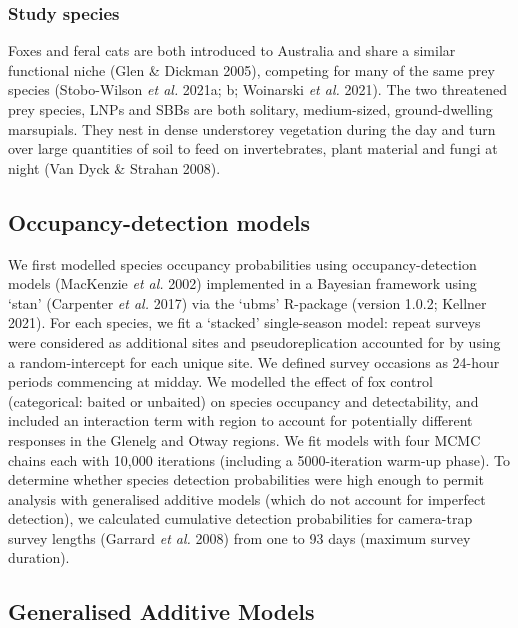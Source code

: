 \documentclass[11pt,a4paper,titlepage,twoside,openright]{style/unimelbthesis}
\begin{document}
\begin{mainmatter}
\hypertarget{study-species-1}{%
\subsubsection{Study species}\label{study-species-1}}

Foxes and feral cats are both introduced to Australia and share a similar functional niche (Glen \& Dickman 2005), competing for many of the same prey species (Stobo-Wilson \emph{et al.} 2021a; b; Woinarski \emph{et al.} 2021). The two threatened prey species, LNPs and SBBs are both solitary, medium-sized, ground-dwelling marsupials. They nest in dense understorey vegetation during the day and turn over large quantities of soil to feed on invertebrates, plant material and fungi at night (Van Dyck \& Strahan 2008).

\hypertarget{occupancy-detection-models}{%
\subsection{Occupancy-detection models}\label{occupancy-detection-models}}

We first modelled species occupancy probabilities using occupancy-detection models (MacKenzie \emph{et al.} 2002) implemented in a Bayesian framework using `stan' (Carpenter \emph{et al.} 2017) via the `ubms' R-package (version 1.0.2; Kellner 2021). For each species, we fit a `stacked' single-season model: repeat surveys were considered as additional sites and pseudoreplication accounted for by using a random-intercept for each unique site. We defined survey occasions as 24-hour periods commencing at midday. We modelled the effect of fox control (categorical: baited or unbaited) on species occupancy and detectability, and included an interaction term with region to account for potentially different responses in the Glenelg and Otway regions. We fit models with four MCMC chains each with 10,000 iterations (including a 5000-iteration warm-up phase). To determine whether species detection probabilities were high enough to permit analysis with generalised additive models (which do not account for imperfect detection), we calculated cumulative detection probabilities for camera-trap survey lengths (Garrard \emph{et al.} 2008) from one to 93 days (maximum survey duration).

\hypertarget{generalised-additive-models}{%
\subsection{Generalised Additive Models}\label{generalised-additive-models}}


\end{mainmatter}
\end{document}
